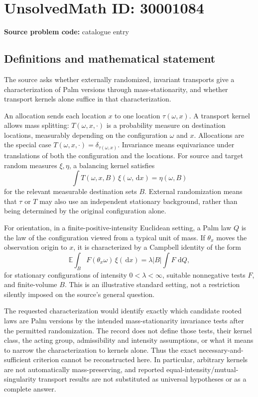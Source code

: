 \documentclass[11pt]{article}
\newcommand{\E}{\mathbb{E}}
\newcommand{\dd}{\,\mathrm{d}}
\begin{document}
\section*{UnsolvedMath ID: 30001084}
\textbf{Source problem code:} catalogue entry
\subsection{Definitions and mathematical statement}
The source asks whether externally randomized, invariant transports give a characterization of Palm versions through mass-stationarity, and whether transport kernels alone suffice in that characterization.

An allocation sends each location \(x\) to one location \(\tau(\omega,x)\). A transport kernel allows mass splitting: \(T(\omega,x,\cdot)\) is a probability measure on destination locations, measurably depending on the configuration \(\omega\) and \(x\). Allocations are the special case \(T(\omega,x,\cdot)=\delta_{\tau(\omega,x)}\). Invariance means equivariance under translations of both the configuration and the locations. For source and target random measures \(\xi,\eta\), a balancing kernel satisfies
\[
\int T(\omega,x,B)\,\xi(\omega,\dd x)=\eta(\omega,B)
\]
for the relevant measurable destination sets \(B\). External randomization means that \(\tau\) or \(T\) may also use an independent stationary background, rather than being determined by the original configuration alone.

For orientation, in a finite-positive-intensity Euclidean setting, a Palm law \(Q\) is the law of the configuration viewed from a typical unit of mass. If \(\theta_x\) moves the observation origin to \(x\), it is characterized by a Campbell identity of the form
\[
\E\int_B F(\theta_x\omega)\,\xi(\dd x)
=\lambda |B|\int F\,\dd Q,
\]
for stationary configurations of intensity \(0<\lambda<\infty\), suitable nonnegative tests \(F\), and finite-volume \(B\). This is an illustrative standard setting, not a restriction silently imposed on the source's general question.

The requested characterization would identify exactly which candidate rooted laws are Palm versions by the intended mass-stationarity invariance tests after the permitted randomization. The record does not define those tests, their kernel class, the acting group, admissibility and intensity assumptions, or what it means to narrow the characterization to kernels alone. Thus the exact necessary-and-sufficient criterion cannot be reconstructed here. In particular, arbitrary kernels are not automatically mass-preserving, and reported equal-intensity/mutual-singularity transport results are not substituted as universal hypotheses or as a complete answer.
\end{document}
